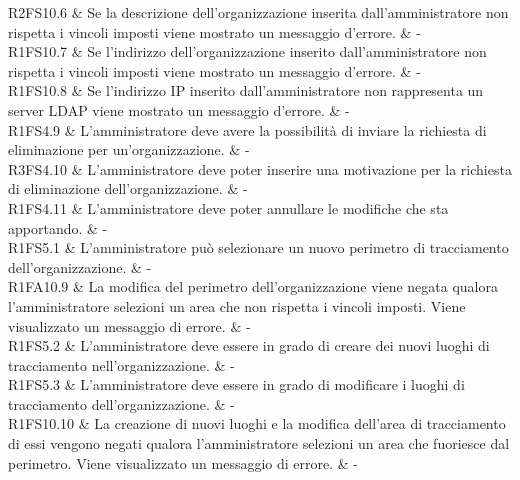 R2FS10.6 & Se la descrizione dell'organizzazione inserita dall'amministratore non rispetta i vincoli imposti viene mostrato un messaggio d'errore. & - \\

R1FS10.7 & Se l'indirizzo dell'organizzazione inserito dall'amministratore non rispetta i vincoli imposti viene mostrato un messaggio d'errore.  & - \\

R1FS10.8 & Se l'indirizzo IP inserito dall'amministratore non rappresenta un server LDAP viene mostrato un messaggio d'errore.  & - \\

R1FS4.9 & L'amministratore deve avere la possibilità di inviare la richiesta di eliminazione per un'organizzazione.  & - \\

R3FS4.10 & L'amministratore deve poter inserire una motivazione per la richiesta di eliminazione dell'organizzazione.  & - \\

R1FS4.11 & L'amministratore deve poter annullare le modifiche che sta apportando.  & - \\




R1FS5.1 & L'amministratore può selezionare un nuovo perimetro di tracciamento dell'organizzazione. & - \\

R1FA10.9 & La modifica del perimetro dell'organizzazione viene negata qualora l'amministratore selezioni un area che non rispetta i vincoli imposti. Viene visualizzato un messaggio di errore.  & - \\

R1FS5.2 & L'amministratore deve essere in grado di creare dei nuovi luoghi di tracciamento nell'organizzazione.  & - \\

R1FS5.3 & L'amministratore deve essere in grado di modificare i luoghi di tracciamento dell'organizzazione.  & - \\

R1FS10.10 & La creazione di nuovi luoghi e la modifica dell'area di tracciamento di essi vengono negati qualora l'amministratore selezioni un area che fuoriesce dal perimetro. Viene visualizzato un messaggio di errore.  & - \\

